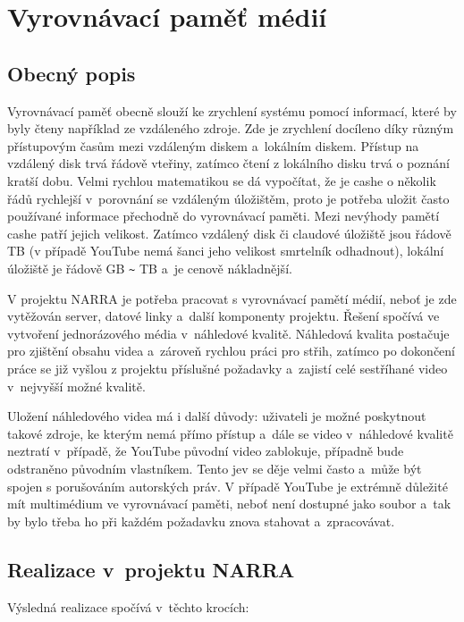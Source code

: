 \section{Vyrovnávací paměť médií}
\subsection{Obecný popis}
\par Vyrovnávací paměť\cite{sap} obecně slouží ke zrychlení systému pomocí  informací, které by byly čteny například ze vzdáleného zdroje. Zde je zrychlení docíleno díky různým přístupovým časům mezi vzdáleným diskem a~lokálním diskem. Přístup na vzdálený disk trvá řádově vteřiny, zatímco čtení z lokálního disku trvá o poznání kratší dobu. Velmi rychlou matematikou se dá vypočítat, že je cashe o několik řádů rychlejší v~porovnání se vzdáleným úložištěm, proto je potřeba uložit často používané informace přechodně do vyrovnávací paměti. Mezi nevýhody pamětí cashe patří jejich velikost. Zatímco vzdálený disk či claudové úložiště jsou řádově TB (v případě YouTube nemá šanci jeho velikost smrtelník odhadnout), lokální úložiště je řádově GB \verb|~| TB a~je cenově nákladnější.
\par V projektu NARRA je potřeba pracovat s vyrovnávací pamětí médií, neboť je zde vytěžován server, datové linky a~další komponenty projektu. Řešení spočívá ve vytvoření jednorázového média v~náhledové kvalitě. Náhledová kvalita postačuje pro zjištění obsahu videa a~zároveň rychlou práci pro střih, zatímco po dokončení práce se již vyšlou z projektu příslušné požadavky a~zajistí celé sestříhané video v~nejvyšší možné kvalitě.
\par Uložení náhledového videa má i další důvody: uživateli je možné poskytnout takové zdroje, ke kterým nemá přímo přístup a~dále se video v~náhledové kvalitě neztratí v~případě, že YouTube původní video zablokuje, případně bude odstraněno původním vlastníkem. Tento jev se děje velmi často a~může být spojen s porušováním autorských práv. V případě YouTube je extrémně důležité mít multimédium ve vyrovnávací paměti, neboť není dostupné jako soubor a~tak by bylo třeba ho při každém požadavku znova stahovat a~zpracovávat.

\subsection{Realizace v~projektu NARRA}
\par Výsledná realizace spočívá v~těchto krocích:


